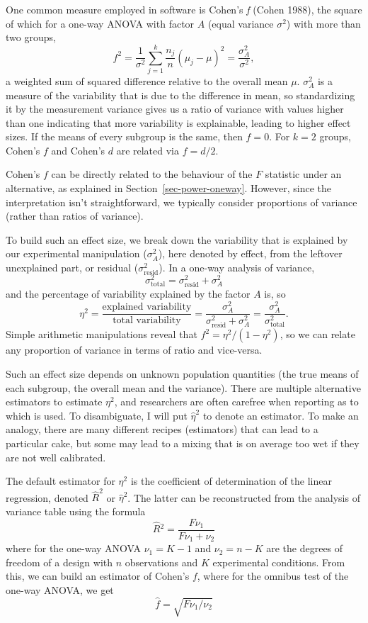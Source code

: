 \documentclass[
  11pt,
  letterpaper,
]{scrbook}
\theoremstyle{definition}
\theoremstyle{definition}
\theoremstyle{remark}
\begin{document}
One common measure employed in software is Cohen's \emph{f} (Cohen
1988), the square of which for a one-way ANOVA with factor \(A\) (equal
variance \(\sigma^2\)) with more than two groups, \[
f^2 = \frac{1}{\sigma^2} \sum_{j=1}^k \frac{n_j}{n}(\mu_j - \mu)^2 = \frac{\sigma^2_{A}}{\sigma^2},
\] a weighted sum of squared difference relative to the overall mean
\(\mu\). \(\sigma^2_{A}\) is a measure of the variability that is due to
the difference in mean, so standardizing it by the measurement variance
gives us a ratio of variance with values higher than one indicating that
more variability is explainable, leading to higher effect sizes. If the
means of every subgroup is the same, then \(f=0\). For \(k=2\) groups,
Cohen's \(f\) and Cohen's \(d\) are related via \(f=d/2\).

Cohen's \(f\) can be directly related to the behaviour of the \(F\)
statistic under an alternative, as explained in
Section~\ref{sec-power-oneway}. However, since the interpretation isn't
straightforward, we typically consider proportions of variance (rather
than ratios of variance).

To build such an effect size, we break down the variability that is
explained by our experimental manipulation (\(\sigma^2_A\)), here
denoted by effect, from the leftover unexplained part, or residual
(\(\sigma^2_\text{resid}\)). In a one-way analysis of variance,
\[\sigma^2_{\text{total}} = \sigma^2_{\text{resid}} + \sigma^2_{A}\] and
the percentage of variability explained by the factor \(A\) is, so
\[\eta^2 = \frac{\text{explained variability}}{\text{total variability}}= \frac{\sigma^2_{A}}{\sigma^2_{\text{resid}} + \sigma^2_{A}} = \frac{\sigma^2_{A}}{\sigma^2_{\text{total}}}.\]
Simple arithmetic manipulations reveal that \(f^2 = \eta^2/(1-\eta^2)\),
so we can relate any proportion of variance in terms of ratio and
vice-versa.

Such an effect size depends on unknown population quantities (the true
means of each subgroup, the overall mean and the variance). There are
multiple alternative estimators to estimate \(\eta^2\), and researchers
are often carefree when reporting as to which is used. To disambiguate,
I will put \(\hat{\eta}^2\) to denote an estimator. To make an analogy,
there are many different recipes (estimators) that can lead to a
particular cake, but some may lead to a mixing that is on average too
wet if they are not well calibrated.

The default estimator for \(\eta^2\) is the coefficient of determination
of the linear regression, denoted \(\widehat{R}^2\) or
\(\widehat{\eta}^2\). The latter can be reconstructed from the analysis
of variance table using the formula \[
\widehat{R}{}^2 = \frac{F\nu_1}{F\nu_1 + \nu_2}
\] where for the one-way ANOVA \(\nu_1 = K-1\) and \(\nu_2 = n-K\) are
the degrees of freedom of a design with \(n\) observations and \(K\)
experimental conditions. From this, we can build an estimator of Cohen's
\(f\), where for the omnibus test of the one-way ANOVA, we get \[
\widehat{f} = \sqrt{F\nu_1/\nu_2}
\]
\end{document}
